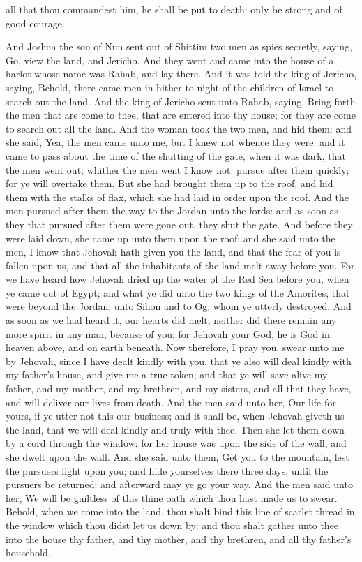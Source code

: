 all that thou commandest him, he shall be put to death: only be strong and of good courage. 

And Joshua the son of Nun sent out of Shittim two men as spies secretly, saying, Go, view the land, and Jericho. And they went and came into the house of a harlot whose name was Rahab, and lay there. And it was told the king of Jericho, saying, Behold, there came men in hither to-night of the children of Israel to search out the land. And the king of Jericho sent unto Rahab, saying, Bring forth the men that are come to thee, that are entered into thy house; for they are come to search out all the land. And the woman took the two men, and hid them; and she said, Yea, the men came unto me, but I knew not whence they were: and it came to pass about the time of the shutting of the gate, when it was dark, that the men went out; whither the men went I know not: pursue after them quickly; for ye will overtake them. But she had brought them up to the roof, and hid them with the stalks of flax, which she had laid in order upon the roof. And the men pursued after them the way to the Jordan unto the fords: and as soon as they that pursued after them were gone out, they shut the gate.  And before they were laid down, she came up unto them upon the roof; and she said unto the men, I know that Jehovah hath given you the land, and that the fear of you is fallen upon us, and that all the inhabitants of the land melt away before you. For we have heard how Jehovah dried up the water of the Red Sea before you, when ye came out of Egypt; and what ye did unto the two kings of the Amorites, that were beyond the Jordan, unto Sihon and to Og, whom ye utterly destroyed. And as soon as we had heard it, our hearts did melt, neither did there remain any more spirit in any man, because of you: for Jehovah your God, he is God in heaven above, and on earth beneath. Now therefore, I pray you, swear unto me by Jehovah, since I have dealt kindly with you, that ye also will deal kindly with my father’s house, and give me a true token; and that ye will save alive my father, and my mother, and my brethren, and my sisters, and all that they have, and will deliver our lives from death. And the men said unto her, Our life for yours, if ye utter not this our business; and it shall be, when Jehovah giveth us the land, that we will deal kindly and truly with thee.  Then she let them down by a cord through the window: for her house was upon the side of the wall, and she dwelt upon the wall. And she said unto them, Get you to the mountain, lest the pursuers light upon you; and hide yourselves there three days, until the pursuers be returned: and afterward may ye go your way. And the men said unto her, We will be guiltless of this thine oath which thou hast made us to swear. Behold, when we come into the land, thou shalt bind this line of scarlet thread in the window which thou didst let us down by: and thou shalt gather unto thee into the house thy father, and thy mother, and thy brethren, and all thy father’s household. 
